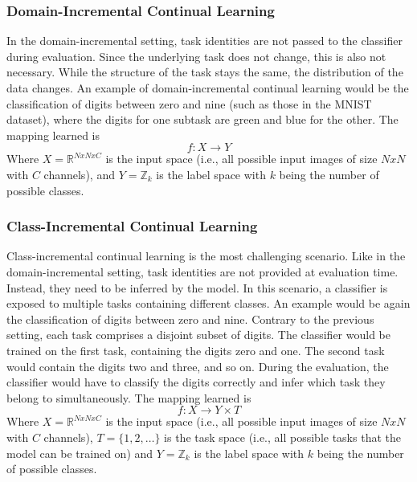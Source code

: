 \subsubsection{Domain-Incremental Continual Learning}
\label{sec:DomainIncrementalContinualLearning}
In the domain-incremental setting, task identities are not passed to the classifier during evaluation. Since the underlying task does not change, this is also not necessary.
While the structure of the task stays the same, the distribution of the data changes. An example of domain-incremental continual learning would be the classification of digits
between zero and nine (such as those in the MNIST \cite{mnist_web} dataset), where the digits for one subtask are green and blue for the other. The mapping learned is
\begin{equation}
    f: X \rightarrow Y
\end{equation}
Where $X = \mathbb{R}^{N x N x C}$ is the input space (i.e., all possible input images of size $N x N$ with $C$ channels), and $Y = \mathbb{Z}_{k}$ is the label space with $k$ being the
number of possible classes.

\subsubsection{Class-Incremental Continual Learning}
\label{sec:ClassIncrementalContinualLearning}
Class-incremental continual learning is the most challenging scenario. Like in the domain-incremental setting, task identities are not provided at evaluation time. Instead, they need to
be inferred by the model. In this scenario, a classifier is exposed to multiple tasks containing different classes. An example would be again the classification of digits between zero and nine.
Contrary to the previous setting, each task comprises a disjoint subset of digits. The classifier would be trained on the first task, containing the digits zero and one. The second task
would contain the digits two and three, and so on. During the evaluation, the classifier would have to classify the digits correctly and infer which task they belong to simultaneously. 
The mapping learned is
\begin{equation}
    f: X \rightarrow Y \times T
\end{equation}
Where $X = \mathbb{R}^{N x N x C}$ is the input space (i.e., all possible input images of size $N x N$ with $C$ channels), $T = \{1,2,\ldots\}$ is the task space (i.e., all possible
tasks that the model can be trained on) and $Y = \mathbb{Z}_{k}$ is the label space with $k$ being the number of possible classes.

